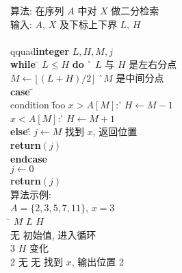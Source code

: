 \documentclass[nofonts]{ctexart}
\newcommand\kw{\textbf} %
\begin{document}
\begin{tabbing}
        \pushtabs %
        算法: 在序列 $A$ 中对 $X$ 做二分检索    \\
        输入: $A$, $X$ 及下标上下界 $L$, $H$    \\
        \\qquad\=\kw{integer} $L, H, M, j$      \\
        \kw{while} \=\+ $L \leq H$ \kw{do} \` $L$ 与 $H$ 是左右分点     \\
        $M \gets \lfloor(L+H)/2\rfloor$ \`$M$ 是中间分点                \\
        \kw{case} \=\+                                                  \\
                condition \= foo \+\kill 
                $x > A[M]$:\' $H \gets M-1$                             \\
                $x < A[M]$:\' $H \gets M+1$                             \\
                \kw{else}:\' \= $j \gets M$ \` 找到 $x$, 返回位置       \\
                     \> \kw{return}$(j)$                                \\
                \<\< \kw{endcase} \-\-\-                                \\
$j \gets 0$                                                             \\
\kw{return}$(j)$ \-                                                     \\
\poptabs 
算法示例:                                                               \\
$A = \{2, 3, 5, 7, 11\}$, $x=3$                                         \\
\qquad\=\+ $M$\qquad \= $L$\qquad \= $H$\qquad \=                       \\
        无              \> 初始值, 进入循环                     \\
        3               \> $H$ 变化                             \\
        2       \> 无   \> 无   \> 找到 $x$, 输出位置 2
\end{tabbing}
\end{document}
